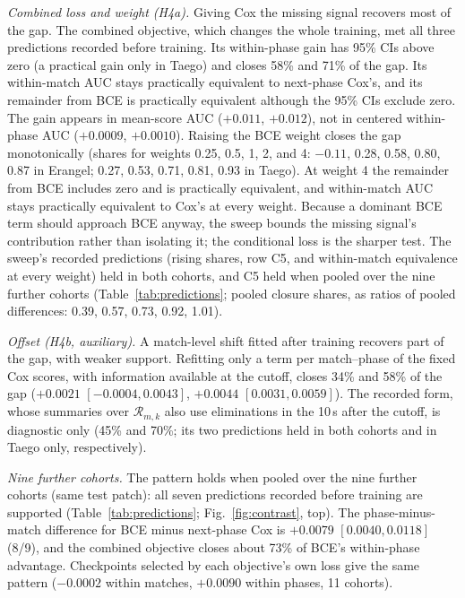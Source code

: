 \documentclass[sigconf,anonymous]{acmart}
\begin{document}
\emph{Combined loss and weight (H4a).} Giving Cox the missing signal recovers most of the gap. The combined objective, which changes the whole training, met all three predictions recorded before training. Its within-phase gain has 95\% CIs above zero (a practical gain only in Taego) and closes 58\% and 71\% of the gap. Its within-match AUC stays practically equivalent to next-phase Cox's, and its remainder from BCE is practically equivalent although the 95\% CIs exclude zero. The gain appears in mean-score AUC ($+0.011$, $+0.012$), not in centered within-phase AUC ($+0.0009$, $+0.0010$). Raising the BCE weight closes the gap monotonically (shares for weights 0.25, 0.5, 1, 2, and 4: $-0.11$, 0.28, 0.58, 0.80, 0.87 in Erangel; 0.27, 0.53, 0.71, 0.81, 0.93 in Taego). At weight 4 the remainder from BCE includes zero and is practically equivalent, and within-match AUC stays practically equivalent to Cox's at every weight. Because a dominant BCE term should approach BCE anyway, the sweep bounds the missing signal's contribution rather than isolating it; the conditional loss is the sharper test. The sweep's recorded predictions (rising shares, row C5, and within-match equivalence at every weight) held in both cohorts, and C5 held when pooled over the nine further cohorts (Table~\ref{tab:predictions}; pooled closure shares, as ratios of pooled differences: 0.39, 0.57, 0.73, 0.92, 1.01).

\emph{Offset (H4b, auxiliary).} A match-level shift fitted after training recovers part of the gap, with weaker support. Refitting only a term per match--phase of the fixed Cox scores, with information available at the cutoff, closes 34\% and 58\% of the gap ($+0.0021$ $[-0.0004,\allowbreak 0.0043]$, $+0.0044$ $[0.0031,\allowbreak 0.0059]$). The recorded form, whose summaries over $\mathcal{R}_{m,k}$ also use eliminations in the 10\,s after the cutoff, is diagnostic only (45\% and 70\%; its two predictions held in both cohorts and in Taego only, respectively).


\emph{Nine further cohorts.} The pattern holds when pooled over the nine further cohorts (same test patch): all seven predictions recorded before training are supported (Table~\ref{tab:predictions}; Fig.~\ref{fig:contrast}, top). The phase-minus-match difference for BCE minus next-phase Cox is $+0.0079$ $[0.0040,\allowbreak 0.0118]$ (8/9), and the combined objective closes about 73\% of BCE's within-phase advantage. Checkpoints selected by each objective's own loss give the same pattern ($-0.0002$ within matches, $+0.0090$ within phases, 11 cohorts).
\end{document}
